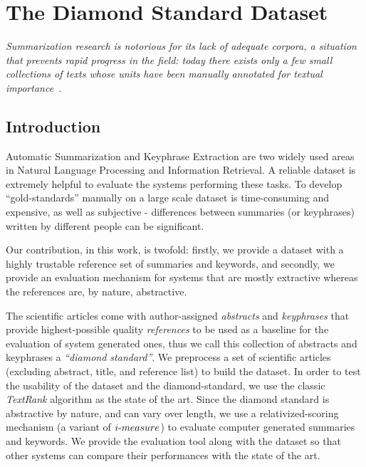 \documentclass[a4paper]{report}
\begin{document}
\chapter{The Diamond Standard Dataset}
\label{dsd}
\emph{Summarization research is notorious for its lack of adequate corpora, a situation that prevents rapid progress in the field: today there exists only a few small collections of texts whose units have been manually annotated for textual importance~\cite{Marcu:1999:ACL:312624.312668}.}
\section{Introduction}
Automatic Summarization and Keyphrase Extraction are two widely used areas in Natural Language Processing and Information Retrieval. A reliable dataset is extremely helpful to evaluate the systems performing these tasks. To develop ``gold-standards'' manually on a large scale dataset is time-consuming and expensive, as well as subjective - differences between summaries (or keyphrases) written by different people can be significant. 

\par Our contribution, in this work, is twofold: firstly, we provide a dataset with a highly trustable reference set of summaries and keywords, and secondly, we provide an evaluation mechanism for systems that are mostly extractive whereas the references are, by nature, abstractive.

\par The scientific articles come with author-assigned \emph{abstracts} and \emph{keyphrases} that provide highest-possible quality \emph{references} to be used as a  baseline for the evaluation of system generated ones, thus we call this collection of abstracts and keyphrases a \emph{``diamond standard''}. We preprocess a set of scientific articles (excluding abstract, title, and reference list) to build the dataset. In order to test the usability of the dataset and the diamond-standard, we use the classic \emph{TextRank} algorithm as the state of the art. Since the diamond standard is abstractive by nature, and can vary over length, we use a relativized-scoring mechanism (a variant of $i\hbox{-}measure$) to evaluate computer generated summaries and keywords. We provide the evaluation tool along with the dataset so that other systems can compare their performances with the state of the art.
\end{document}
